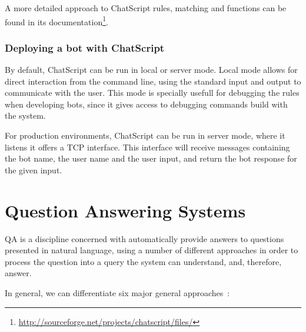 A more detailed approach to ChatScript rules, matching and functions can be found in its documentation\footnote{\url{http://sourceforge.net/projects/chatscript/files/}}.

\subsubsection{Deploying a bot with ChatScript}

By default, ChatScript can be run in local or server mode. Local mode allows for direct interaction from the command line, using the standard input and output to communicate with the user. This mode is specially usefull for debugging the rules when developing bots, since it gives access to debugging commands build with the system.

For production environments, ChatScript can be run in server mode, where it listens it offers a TCP interface. This interface will receive messages containing the bot name, the user name and the user input, and return the bot response for the given input.

\section{Question Answering Systems}
\label{sec:qa_sys}

\ac{QA} is a discipline concerned with automatically provide answers to questions presented in natural language, using a number of different approaches in order to process the question into a query the system can understand, and, therefore, answer.

In general, we can differentiate six major general approaches~\cite{unger2014an}:

